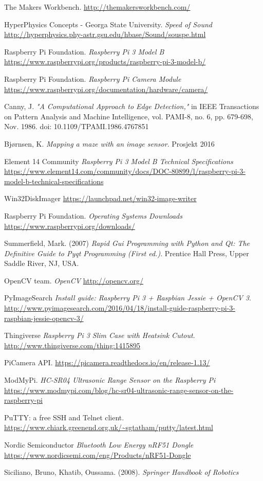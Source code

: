 \begin{thebibliography}{99}
The Makers Workbench. \url{http://themakersworkbench.com/}

HyperPhysics Concepts - Georga State University. \emph{Speed of Sound} \url{http://hyperphysics.phy-astr.gsu.edu/hbase/Sound/souspe.html}
    
Raspberry Pi Foundation. \emph{Raspberry Pi 3 Model B} \url{https://www.raspberrypi.org/products/raspberry-pi-3-model-b/}

Raspberry Pi Foundation. \emph{Raspberry Pi Camera Module} \url{https://www.raspberrypi.org/documentation/hardware/camera/}

	Canny, J. \emph{"A Computational Approach to Edge Detection,"} in IEEE Transactions on Pattern Analysis and Machine Intelligence, vol. PAMI-8, no. 6, pp. 679-698, Nov. 1986.
doi: 10.1109/TPAMI.1986.4767851

	Bjørnsen, K. \emph{Mapping a maze with an image sensor}. Prosjekt 2016
    
	Element 14 Community \emph{Raspberry Pi 3 Model B Technical Specifications} \url{https://www.element14.com/community/docs/DOC-80899/l/raspberry-pi-3-model-b-technical-specifications}
    
	Win32DiskImager \url{https://launchpad.net/win32-image-writer}

	Raspberry Pi Foundation. \emph{Operating Systems Downloads} \url{https://www.raspberrypi.org/downloads/}
    
	Summerfield, Mark. (2007) \emph{Rapid Gui Programming with Python and Qt: The Definitive Guide to Pyqt Programming (First ed.)}. Prentice Hall Press, Upper Saddle River, NJ, USA.
    
    
	OpenCV team. \emph{OpenCV} \url{http://opencv.org/}
    
	PyImageSearch \emph{Install guide: Raspberry Pi 3 + Raspbian Jessie + OpenCV 3}.  \url{http://www.pyimagesearch.com/2016/04/18/install-guide-raspberry-pi-3-raspbian-jessie-opencv-3/}

	Thingiverse \emph{Raspberry Pi 3 Slim Case with Heatsink Cutout}. \url{http://www.thingiverse.com/thing:1415895}
    
	PiCamera API. \url{https://picamera.readthedocs.io/en/release-1.13/}

	ModMyPi. \emph{HC-SR04 Ultrasonic Range Sensor on the Raspberry Pi} \url{https://www.modmypi.com/blog/hc-sr04-ultrasonic-range-sensor-on-the-raspberry-pi}
    
	PuTTY: a free SSH and Telnet client. \url{https://www.chiark.greenend.org.uk/~sgtatham/putty/latest.html}
    
	Nordic Semiconductor \emph{Bluetooth Low Energy nRF51 Dongle} \url{https://www.nordicsemi.com/eng/Products/nRF51-Dongle}
    
	Siciliano, Bruno, Khatib, Oussama. (2008). \emph{Springer Handbook of Robotics}
    

\end{thebibliography}